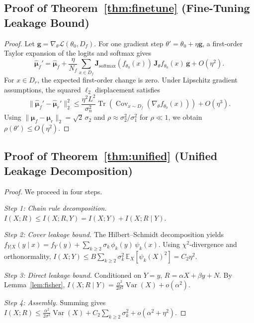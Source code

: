 \documentclass[journal]{IEEEtran}
\theoremstyle{definition}
\begin{document}
\subsection{Proof of Theorem~\ref{thm:finetune} (Fine-Tuning Leakage Bound)}
\begin{proof}
Let $\mathbf{g} = \nabla_\theta\mathcal{L}(\theta_0, D_f)$. For one gradient step $\theta' = \theta_0 + \eta\mathbf{g}$, a first-order Taylor expansion of the logits and softmax gives
\begin{equation}
\hat{\boldsymbol{\mu}}_f' = \hat{\boldsymbol{\mu}}_f
+ \frac{\eta}{N_f}\sum_{x\in D_f}
\mathbf{J}_{\mathrm{softmax}}(f_{\theta_0}(x))\,
\mathbf{J}_\theta f_{\theta_0}(x)\,\mathbf{g}
+ O(\eta^2).
\end{equation}
For $x \in D_r$, the expected first-order change is zero. Under Lipschitz gradient assumptions, the squared $\ell_2$ displacement satisfies
\begin{equation}
\|\hat{\boldsymbol{\mu}}_f' - \hat{\boldsymbol{\mu}}_r'\|_2^2 \le \frac{\eta^2 L^2}{\sigma_n^2}\operatorname{Tr}(\operatorname{Cov}_{x\sim D_f}(\nabla_\theta f_{\theta_0}(x))) + O(\eta^3).
\end{equation}
Using $\|\boldsymbol{\mu}_f-\boldsymbol{\mu}_r\|_2 = \sqrt{2}\,\sigma_2$ and $\rho \approx \sigma_2^2/\sigma_1^2$ for $\rho\ll 1$, we obtain $\rho(\theta') \le O(\eta^2)$.
\end{proof}

\subsection{Proof of Theorem~\ref{thm:unified} (Unified Leakage Decomposition)}
\begin{proof}
We proceed in four steps.

\noindent\textit{Step 1: Chain rule decomposition.}
$I(X;R) \le I(X;R,Y) = I(X;Y) + I(X;R\mid Y).$

\noindent\textit{Step 2: Cover leakage bound.}
The Hilbert--Schmidt decomposition yields $f_{Y|X}(y\mid x) = f_Y(y) + \sum_{k\ge 2} \sigma_k\,\phi_k(y)\,\psi_k(x).$ Using $\chi^2$-divergence and orthonormality, $I(X;Y) \le B\sum_{k\ge 2}\sigma_k^2\,\mathbb{E}_X[\psi_k(X)^2] = C_2\eta^2.$

\noindent\textit{Step 3: Direct leakage bound.}
Conditioned on $Y=y$, $R = \alpha X + \beta y + N$. By Lemma~\ref{lem:fisher}, $I(X;R\mid Y) = \frac{\alpha^2}{2\sigma^2}\operatorname{Var}(X) + o(\alpha^2).$

\noindent\textit{Step 4: Assembly.}
Summing gives $I(X;R) \le \frac{\alpha^2}{2\sigma^2}\operatorname{Var}(X) + C_2\sum_{k\ge 2}\sigma_k^2 + o(\alpha^2+\eta^2).$
\end{proof}
\end{document}
